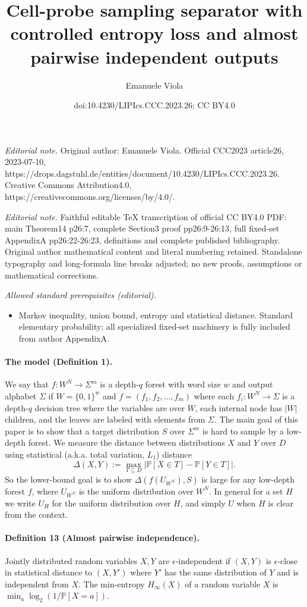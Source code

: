 \documentclass[10pt,a4paper]{article}
\title{Cell-probe sampling separator with controlled entropy loss and almost pairwise independent outputs}
\author{Emanuele Viola}
\date{doi:10.4230/LIPIcs.CCC.2023.26; CC BY4.0}
\begin{document}
\maketitle
\noindent\textit{Editorial note.} Original author: Emanuele Viola. Official CCC2023 article26, 2023-07-10, https://drops.dagstuhl.de/entities/document/10.4230/LIPIcs.CCC.2023.26. Creative Commons Attribution4.0, https://creativecommons.org/licenses/by/4.0/.\par\medskip
\noindent\textit{Editorial note.} Faithful editable TeX transcription of official CC BY4.0 PDF: main Theorem14 p26:7, complete Section3 proof pp26:9-26:13, full fixed-set AppendixA pp26:22-26:23, definitions and complete published bibliography. Original author mathematical content and literal numbering retained. Standalone typography and long-formula line breaks adjusted; no new proofs, assumptions or mathematical corrections.\par\medskip
\noindent\textit{Allowed standard prerequisites (editorial).}\begin{itemize}
\item Markov inequality, union bound, entropy and statistical distance. Standard elementary probability; all specialized fixed-set machinery is fully included from author AppendixA.
\end{itemize}\medskip
\paragraph{The model (Definition 1).}
We say that $f:W^N\to\Sigma^m$ is a depth-$q$ forest with word size $w$ and output alphabet $\Sigma$ if $W=\{0,1\}^w$ and $f=(f_1,f_2,\ldots,f_m)$ where each $f_i:W^N\to\Sigma$ is a depth-$q$ decision tree where the variables are over $W$, each internal node has $|W|$ children, and the leaves are labeled with elements from $\Sigma$.
The main goal of this paper is to show that a target distribution $S$ over $\Sigma^m$ is hard to sample by a low-depth forest. We measure the distance between distributions $X$ and $Y$ over $D$ using statistical (a.k.a. total variation, $L_1$) distance
\[\Delta(X,Y):=\max_{T\subseteq D}|\mathbb P[X\in T]-\mathbb P[Y\in T]|.\]
So the lower-bound goal is to show $\Delta(f(U_{W^N}),S)$ is large for any low-depth forest $f$, where $U_{W^N}$ is the uniform distribution over $W^N$. In general for a set $H$ we write $U_H$ for the uniform distribution over $H$, and simply $U$ when $H$ is clear from the context.
\paragraph{Definition 13 (Almost pairwise independence).}
Jointly distributed random variables $X,Y$ are $\epsilon$-independent if $(X,Y)$ is $\epsilon$-close in statistical distance to $(X,Y')$ where $Y'$ has the same distribution of $Y$ and is independent from $X$.
The min-entropy $H_\infty(X)$ of a random variable $X$ is $\min_a\log_2(1/\mathbb P[X=a])$.
\end{document}
